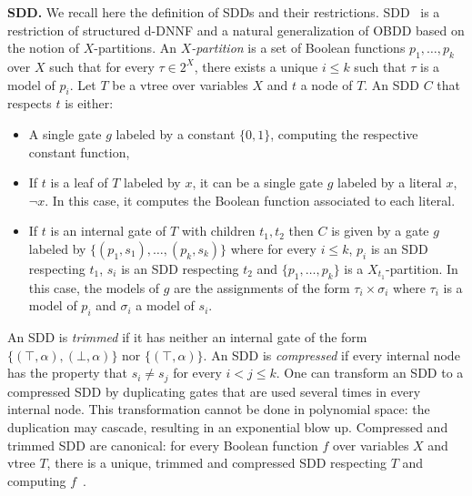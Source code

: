 \documentclass[a4paper,UKenglish,cleveref, autoref, thm-restate]{lipics-v2021}
\newcommand{\florent}[1]{\todo[color=green]{Florent: #1}}
\newcommand{\martin}[1]{\todo[color=yellow]{\color{violet}{{\bf Martín}: #1}}}
\newcommand{\guy}[1]{\todo[color=purple]{\color{white}{{\bf Guy}: #1}}}
\begin{document}
\begin{toappendix}
  \textbf{SDD.} We recall here the definition of SDDs and their restrictions. SDD~\cite{Darwiche11} is a restriction of structured d-DNNF and a natural generalization of OBDD based on the notion of $X$-partitions. An \emph{$X$-partition} is a set of Boolean functions $p_1,\dots,p_k$ over $X$ such that for every $\tau \in 2^X$, there exists a unique $i\leq k$ such that $\tau$ is a model of $p_i$.
%
Let $T$ be a vtree over variables $X$ and $t$ a node of $T$. An SDD $C$ that respects $t$ is either:
\begin{itemize}
	\item A single gate $g$ labeled by a constant $\{0,1\}$, computing the respective constant function,
	\item If $t$ is a leaf of $T$ labeled by $x$, it can be a single gate $g$ labeled by a literal $x$, $\neg x$. In this case, it computes the Boolean function associated to each literal.
	\item If $t$ is an internal gate of $T$ with children $t_1,t_2$ then $C$ is given by a gate $g$ labeled by $\{(p_1,s_1),\dots,(p_k,s_k)\}$ where for every $i \leq k$, $p_i$ is an SDD respecting $t_1$, $s_i$ is an SDD respecting $t_2$ and $\{p_1, \dots, p_k\}$ is a $X_{t_1}$-partition. In this case, the models of $g$ are the assignments of the form $\tau_i \times \sigma_i$ where $\tau_i$ is a model of $p_i$ and $\sigma_i$ a model of $s_i$.
\end{itemize}


An SDD is \emph{trimmed} if it has neither an internal gate of the form $\{(\top,\alpha), (\bot, \alpha)\}$ nor $\{(\top,\alpha)\}$.
An SDD is \emph{compressed} if every internal node has the property that $s_i \neq s_j$ for every $i < j \leq k$. One can transform an SDD to a compressed SDD by duplicating
gates that are used several times in every internal node. This transformation cannot be done in polynomial space: the duplication may cascade, resulting in an exponential blow up. Compressed and trimmed SDD are canonical: for every Boolean function $f$ over variables $X$ and vtree $T$, there is a unique, trimmed and compressed SDD respecting $T$ and computing $f$~\cite{Darwiche11}.

\end{toappendix}
\end{document}
